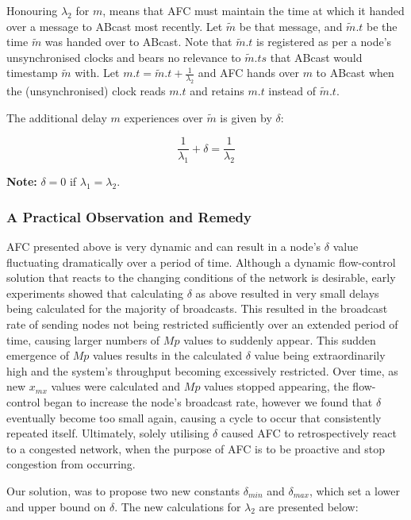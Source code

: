         Honouring $\lambda_2$ for $m$, means that AFC must maintain the time at which it handed over a message to \textsf{ABcast} most recently.  Let $\tilde{m}$ be that message, and $\tilde{m}.t$ be the time $\tilde{m}$ was handed over to \textsf{ABcast}.  Note that $\tilde{m}.t$ is registered as per a node's unsynchronised clocks and bears no relevance to $\tilde{m}.ts$ that \textsf{ABcast} would timestamp $\tilde{m}$ with.  Let $m.t = \tilde{m}.t + \frac{1}{\lambda_2}$ and AFC hands over $m$ to \textsf{ABcast} when the (unsynchronised) clock reads $m.t$ and retains $m.t$ instead of $\tilde{m}.t$.  
        
        The additional delay $m$ experiences over $\tilde{m}$ is given by $\delta$:
        
        \begin{equation}
            \frac{1}{\lambda_1} + \delta = \frac{1}{\lambda_2}
        \end{equation}
        
        \textbf{Note: } $\delta = 0$ if $\lambda_1 = \lambda_2$.  
        
        \subsubsection*{A Practical Observation and Remedy}
    AFC presented above is very dynamic and can result in a node's $\delta$ value fluctuating dramatically over a period of time.  Although a dynamic flow-control solution that reacts to the changing conditions of the network is desirable, early experiments showed that calculating $\delta$ as above resulted in very small delays being calculated for the majority of broadcasts.  This resulted in the broadcast rate of sending nodes not being restricted sufficiently over an extended period of time, causing larger numbers of $Mp$ values to suddenly appear. This sudden emergence of $Mp$ values results in the calculated $\delta$ value being extraordinarily high and the system's throughput becoming excessively restricted.  Over time, as new $x_{mx}$ values were calculated and $Mp$ values stopped appearing, the flow-control began to increase the node's broadcast rate, however we found that $\delta$ eventually become too small again, causing a cycle to occur that consistently repeated itself.  Ultimately, solely utilising $\delta$ caused AFC to retrospectively react to a congested network, when the purpose of AFC is to be proactive and stop congestion from occurring.  
    
    Our solution, was to propose two new constants $\delta_{min}$ and $\delta_{max}$, which set a lower and upper bound on $\delta$.  The new calculations for $\lambda_2$ are presented below:
    

